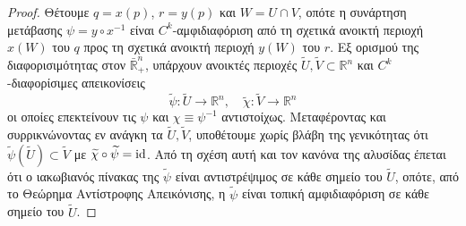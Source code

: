 \documentclass[11pt,a4paper,twoside,openright]{book}
\begin{document}
\begin{proof}
Θέτουμε $q=x(p)$, $r = y(p)$ και $W = U \cap V$, οπότε η συνάρτηση μετάβασης $\psi = y \circ x^{-1}$ είναι $C^k$-αμφιδιαφόριση από τη σχετικά ανοικτή περιοχή $x(W)$ του $q$ προς τη σχετικά ανοικτή περιοχή $y(W)$ του $r$. Eξ ορισμού της διαφορισιμότητας στον $\bar{\mathbb{R}}^n_+$, υπάρχουν ανοικτές περιοχές $\widetilde{U}, \widetilde{V} \subset \mathbb{R}^n$ και $C^k$-διαφορίσιμες απεικονίσεις
\begin{equation*}
\widetilde{\psi}: \widetilde{U} \to \mathbb{R}^n,
\quad
\widetilde{\chi}: \widetilde{V} \to \mathbb{R}^n
\end{equation*}
οι οποίες επεκτείνουν τις $\psi$ και $\chi \equiv \psi^{-1}$
αντιστοίχως.
Μεταφέροντας και συρρικνώνοντας εν ανάγκη τα $\widetilde{U}, \widetilde{V}$, υποθέτουμε χωρίς βλάβη της γενικότητας ότι $\widetilde{\psi}(\widetilde{U}) \subset \widetilde{V}$ με $\widetilde{\chi} \circ \widetilde{\psi} = \textup{id}$. Από τη σχέση αυτή και τον κανόνα της αλυσίδας έπεται ότι ο ιακωβιανός πίνακας της $\widetilde{\psi}$ είναι αντιστρέψιμος σε κάθε σημείο του $\widetilde{U}$, οπότε, από το Θεώρημα Αντίστροφης Απεικόνισης, η $\widetilde{\psi}$ είναι τοπική αμφιδιαφόριση σε κάθε σημείο του $\widetilde{U}$.


\end{proof}
\end{document}
